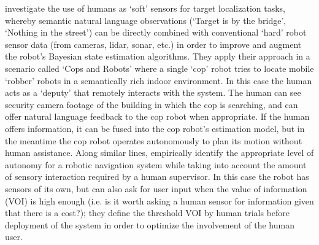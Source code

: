 \citet{Sweet2016-dw} investigate the use of  humans as `soft' sensors for target localization tasks, whereby semantic natural language observations (`Target is by the bridge', `Nothing in the street') can be directly combined with conventional `hard' robot sensor data (from cameras, lidar, sonar, etc.) in order to improve and augment the robot's Bayesian state estimation algorithms. 
They apply their approach in a scenario called `Cops and Robots' where a single `cop' robot tries to locate mobile `robber' robots in a semantically rich indoor environment. 
In this case the human acts as a `deputy' that remotely interacts with the system. The human can see security camera footage of the building in which the cop is searching, and can offer natural language feedback to the cop robot when appropriate. If the human offers information, it can be fused into the cop robot's estimation model, but in the meantime the cop robot operates autonomously to plan its motion without human assistance. 
%
Along similar lines, \citet{Kaupp2008-yr} empirically identify the appropriate level of autonomy for a robotic navigation system while taking into account the amount of sensory interaction required by a human supervisor. In this case the robot has sensors of its own, but can also ask for user input when the value of information (VOI) is high enough (i.e. is it worth asking a human sensor for information given that there is a cost?); they define the threshold VOI by human trials before deployment of the system in order to optimize the involvement of the human user.

